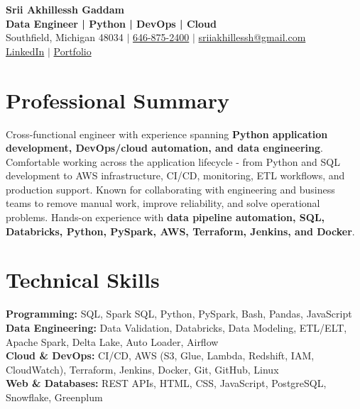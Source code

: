 \documentclass[letterpaper,10pt]{article}
\begin{document}
\fontsize{9.35pt}{10.45pt}\selectfont

\begin{center}
    {\LARGE \textbf{Srii Akhillessh Gaddam}} \\[-1pt]
    \textbf{Data Engineer | Python | DevOps | Cloud} \\[2pt]
    Southfield, Michigan 48034 $|$
    \href{tel:6468752400}{646-875-2400} $|$
    \href{mailto:sriiakhillessh@gmail.com}{sriiakhillessh@gmail.com} \\[1pt]
    \href{https://www.linkedin.com/in/srii-akhiilessh-gaddam-b48668191/}{LinkedIn} $|$
    \href{https://sriiakhillesshg.github.io/portfolio/}{Portfolio}
\end{center}
\vspace{-8pt}

\section{Professional Summary}
\small{Cross-functional engineer with experience spanning \textbf{Python application development, DevOps/cloud automation, and data engineering}. Comfortable working across the application lifecycle - from Python and SQL development to AWS infrastructure, CI/CD, monitoring, ETL workflows, and production support. Known for collaborating with engineering and business teams to remove manual work, improve reliability, and solve operational problems. Hands-on experience with \textbf{data pipeline automation, SQL, Databricks, Python, PySpark, AWS, Terraform, Jenkins, and Docker}.}

\section{Technical Skills}
\small{
\textbf{Programming:} SQL, Spark SQL, Python, PySpark, Bash, Pandas, JavaScript \\
\textbf{Data Engineering:} Data Validation, Databricks, Data Modeling, ETL/ELT, Apache Spark, Delta Lake, Auto Loader, Airflow \\
\textbf{Cloud \& DevOps:} CI/CD, AWS (S3, Glue, Lambda, Redshift, IAM, CloudWatch), Terraform, Jenkins, Docker, Git, GitHub, Linux \\
\textbf{Web \& Databases:} REST APIs, HTML, CSS, JavaScript, PostgreSQL, Snowflake, Greenplum
}

\end{document}
